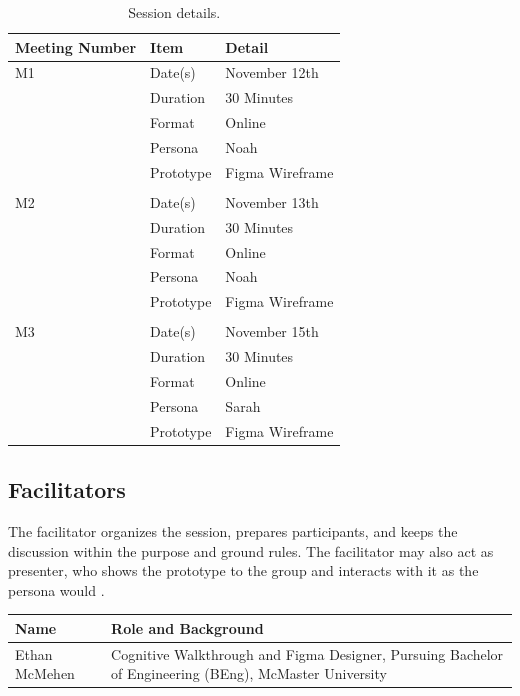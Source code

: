 \documentclass{article}
\begin{document}
\begin{table}[H]
\centering
\caption{Session details.}
\label{tab:session}
\begin{tabularx}{\linewidth}{@{}l l Y@{}}
\toprule
\textbf{Meeting Number} & \textbf{Item} & \textbf{Detail} \\
\midrule
M1 & Date(s) & November 12th \\
& Duration & 30 Minutes \\
& Format & Online \\
& Persona & Noah \\
& Prototype & Figma Wireframe \\
\\
M2 & Date(s) & November 13th \\
& Duration & 30 Minutes \\
& Format & Online \\
& Persona & Noah \\
& Prototype & Figma Wireframe \\
\\
M3 & Date(s) & November 15th \\
& Duration & 30 Minutes \\
& Format & Online \\
& Persona & Sarah \\
& Prototype & Figma Wireframe \\
\bottomrule
\end{tabularx}
\end{table}

\subsection{Facilitators}

The facilitator organizes the session, prepares participants, and keeps the discussion within the purpose and ground rules. 
The facilitator may also act as presenter, who shows the prototype to the group and interacts with it as the persona 
would \cite{nng-workshop}.

\begin{table}[H]
\centering
\begin{tabularx}{\linewidth}{@{}l Y@{}}
\toprule
\textbf{Name} & \textbf{Role and Background} \\
\midrule
Ethan McMehen & Cognitive Walkthrough and Figma Designer, Pursuing Bachelor of Engineering (BEng), McMaster University \\
\bottomrule
\end{tabularx}
\end{table}
\end{document}
